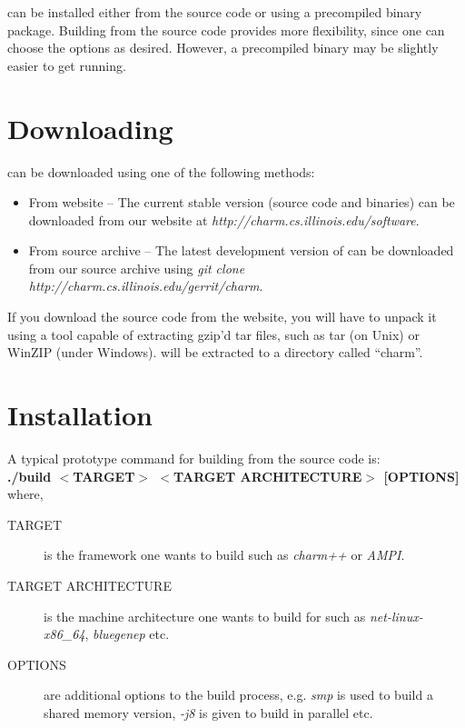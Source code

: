 \charmpp{} can be installed either from the source code or using a precompiled
binary package. Building from the source code provides more flexibility, since one 
can choose the options as desired. However, a precompiled binary may be slightly
easier to get running.
 
\section{Downloading \charmpp{}}

\charmpp{} can be downloaded using one of the following methods:

\begin{itemize}
\item From \charmpp{} website -- The current stable version (source code and
binaries) can be downloaded from our website at {\em http://charm.cs.illinois.edu/software}.
\item From source archive -- The latest development version of \charmpp{} can be downloaded
from our source archive using {\em git clone http://charm.cs.illinois.edu/gerrit/charm}.
\end{itemize}

If you download the source code from the website, you will have to unpack it 
using a tool capable of extracting gzip'd tar files, such as tar (on Unix) 
or WinZIP (under Windows).  \charmpp{} will be extracted to a directory 
called ``charm''. 

\section{Installation}

A typical prototype command for building \charmpp{} from the source code is:
\vspace{5pt}\\
{\bf ./build $<$TARGET$>$ $<$TARGET ARCHITECTURE$>$ [OPTIONS]} where,

\begin{description}
\item [TARGET] is the framework one wants to build such as {\em charm++} or {\em
AMPI}.
\item [TARGET ARCHITECTURE] is the machine architecture one wants to build for
such as {\em net-linux-x86\_64}, {\em bluegenep} etc.
\item [OPTIONS] are additional options to the build process, e.g. {\em smp} is
used to build a shared memory version, {\em -j8} is given to build in parallel
etc.
\end {description}

